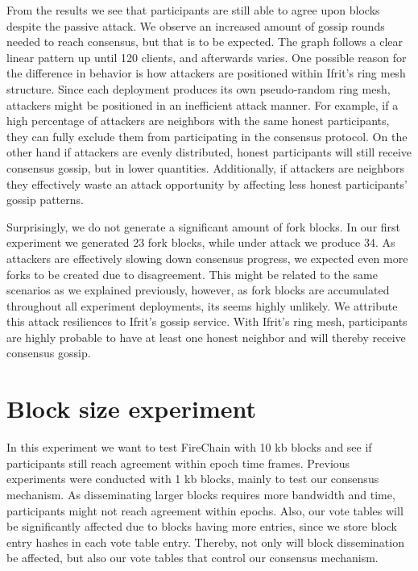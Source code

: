 \documentclass[USenglish]{uit-thesis}
\begin{document}
From the results we see that participants are still able to agree upon blocks despite the passive attack.
We observe an increased amount of gossip rounds needed to reach consensus, but that is to be expected.
The graph follows a clear linear pattern up until 120 clients, and afterwards varies.
One possible reason for the difference in behavior is how attackers are positioned within Ifrit's ring mesh structure.
Since each deployment produces its own pseudo-random ring mesh, attackers might be positioned in an inefficient attack manner.
For example, if a high percentage of attackers are neighbors with the same honest participants, they can fully exclude them from participating in the consensus protocol.
On the other hand if attackers are evenly distributed, honest participants will still receive consensus gossip, but in lower quantities.
Additionally, if attackers are neighbors they effectively waste an attack opportunity by affecting less honest participants' gossip patterns. 



Surprisingly, we do not generate a significant amount of fork blocks.
In our first experiment we generated 23 fork blocks, while under attack we produce 34.
As attackers are effectively slowing down consensus progress, we expected even more forks to be created due to disagreement.
This might be related to the same scenarios as we explained previously, however, as fork blocks are accumulated throughout all experiment deployments, its seems highly unlikely.
We attribute this attack resiliences to Ifrit's gossip service.
With Ifrit's ring mesh, participants are highly probable to have at least one honest neighbor and will thereby receive consensus gossip.




\section{Block size experiment}
In this experiment we want to test FireChain with 10 \gls{kb} blocks and see if participants still reach agreement within epoch time frames.
Previous experiments were conducted with 1 \gls{kb} blocks, mainly to test our consensus mechanism.
As disseminating larger blocks requires more bandwidth and time, participants might not reach agreement within epochs.
Also, our vote tables will be significantly affected due to blocks having more entries, since we store block entry hashes in each vote table entry.
Thereby, not only will block dissemination be affected, but also our vote tables that control our consensus mechanism.
 
\end{document}
